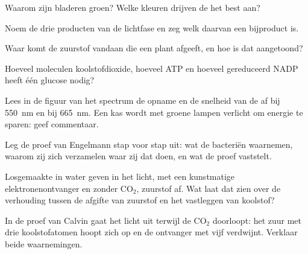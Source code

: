 \begin{exercise}[$\star$]\label{exo:g12:photosynthesis:2}
Waarom zijn bladeren groen? Welke kleuren drijven de  het best aan?
\end{exercise}

\begin{exercise}[$\star$]\label{exo:g12:photosynthesis:3}
Noem de drie producten van de lichtfase en zeg welk daarvan een bijproduct
is.
\end{exercise}

\begin{exercise}[$\star$]\label{exo:g12:photosynthesis:4}
Waar komt de zuurstof vandaan die een plant afgeeft, en hoe is dat
aangetoond?
\end{exercise}

\begin{exercise}[$\star$]\label{exo:g12:photosynthesis:5}
Hoeveel moleculen koolstofdioxide, hoeveel ATP en hoeveel gereduceerd NADP
heeft één glucose nodig?
\end{exercise}

\begin{exercise}[$\star\star$]\label{exo:g12:photosynthesis:6}
Lees in de figuur van het spectrum de opname en de snelheid van de
 af bij \qty{550}{nm} en bij \qty{665}{nm}. Een kas wordt met
groene lampen verlicht om energie te sparen: geef commentaar.
\end{exercise}

\begin{exercise}[$\star\star$]\label{exo:g12:photosynthesis:7}
Leg de proef van Engelmann stap voor stap uit: wat de bacteriën
waarnemen, waarom zij zich verzamelen waar zij dat doen, en wat de proef
vaststelt.
\end{exercise}

\begin{exercise}[$\star\star$]\label{exo:g12:photosynthesis:8}
Losgemaakte  in water geven in het licht, met een
kunstmatige elektronenontvanger en zonder $\mathrm{CO_2}$, zuurstof af.
Wat laat dat zien over de verhouding tussen de afgifte van zuurstof en het
vastleggen van koolstof?
\end{exercise}

\begin{exercise}[$\star\star$]\label{exo:g12:photosynthesis:9}
In de proef van Calvin gaat het licht uit terwijl de $\mathrm{CO_2}$
doorloopt: het zuur met drie koolstofatomen hoopt zich op en de ontvanger
met vijf verdwijnt. Verklaar beide waarnemingen.
\end{exercise}

